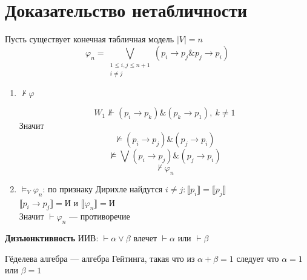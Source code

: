 \documentclass[oneside]{book}
\begin{document}
\section{Доказательство нетабличности}
\label{sec:org41821f9}
Пусть существует конечная табличная модель \(|V| = n\)
\[ \varphi_n =  \bigvee_{\substack{1 \le i, j \le n + 1 \\ i \neq j}} (p_i \to p_j \&p_j \to p_i)\]
\begin{enumerate}
	\item \(\not\vdash\varphi\)
	      \begin{center}
	      \end{center}
	      \[ W_1 \not\Vdash (p_i \to p_k)\&(p_k\to p_1),\ k\neq 1 \]
	      Значит \[ \not\vDash (p_i\to p_j)\&(p_j\to p_i) \]
	      \[ \not\vDash \bigvee (p_i\to p_j)\&(p_j\to p_i) \]
	      \[ \not\vdash\varphi_n \]
	\item \(\vDash_V \varphi_n\): по признаку Дирихле найдутся \(i\neq j:\llbracket p_i \rrbracket = \llbracket p_j \rrbracket\) \\
	      \(\llbracket p_i \to p_j \rrbracket = \text{И}\) и \(\llbracket \varphi_n \rrbracket = \text{И}\) \\
	      Значит \(\vdash \varphi_n\) --- противоречие
\end{enumerate}
\begin{definition}
	\textbf{Дизъюнктивность} ИИВ: \(\vdash \alpha \vee \beta\) влечет \(\vdash \alpha\) или \(\vdash \beta\)
	\label{orgacfe607}
\end{definition}
\begin{definition}
	Гёделева алгебра --- алгебра Гейтинга, такая что из \(\alpha + \beta = 1\) следует что \(\alpha = 1\) или \(\beta = 1\) \\
	\label{org02a40fc}
\end{definition}
\end{document}
